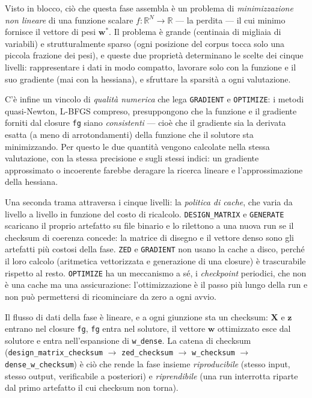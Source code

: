 Visto in blocco, ciò che questa fase assembla è un problema di
\emph{minimizzazione non lineare} di una funzione scalare
$f: \mathbb{R}^{N} \to \mathbb{R}$ — la perdita — il cui minimo fornisce il
vettore di pesi $\bm{w}^{*}$. Il problema è grande (centinaia di migliaia di
variabili) e strutturalmente sparso (ogni posizione del corpus tocca solo una
piccola frazione dei pesi), e queste due proprietà determinano le scelte dei
cinque livelli: rappresentare i dati in modo compatto, lavorare solo con la
funzione e il suo gradiente (mai con la hessiana), e sfruttare la sparsità a
ogni valutazione.

C'è infine un vincolo di \emph{qualità numerica} che lega
\texttt{GRADIENT} e \texttt{OPTIMIZE}: i metodi quasi-Newton, L-BFGS
compreso, presuppongono che la funzione e il gradiente forniti dal closure
\texttt{fg} siano \emph{consistenti} — cioè che il gradiente sia la
derivata esatta (a meno di arrotondamenti) della funzione che il solutore
sta minimizzando. Per questo le due quantità vengono calcolate nella stessa
valutazione, con la stessa precisione e sugli stessi indici: un gradiente
approssimato o incoerente farebbe deragare la ricerca lineare e
l'approssimazione della hessiana.

Una seconda trama attraversa i cinque livelli: la \emph{politica di cache},
che varia da livello a livello in funzione del costo di ricalcolo.
\texttt{DESIGN\_MATRIX} e \texttt{GENERATE} scaricano il proprio artefatto su
file binario e lo rilettono a una nuova run se il checksum di coerenza
concede: la matrice di disegno e il vettore denso sono gli artefatti più
costosi della fase. \texttt{ZED} e \texttt{GRADIENT} non usano la cache a
disco, perché il loro calcolo (aritmetica vettorizzata e generazione di una
closure) è trascurabile rispetto al resto. \texttt{OPTIMIZE} ha un
meccanismo a sé, i \emph{checkpoint} periodici, che non è una cache ma una
assicurazione: l'ottimizzazione è il passo più lungo della run e non può
permettersi di ricominciare da zero a ogni avvio.

Il flusso di dati della fase è lineare, e a ogni giunzione sta un checksum:
$\bm{X}$ e $\bm{z}$ entrano nel closure \texttt{fg}, \texttt{fg} entra nel
solutore, il vettore $\bm{w}$ ottimizzato esce dal solutore e entra
nell'espansione di \texttt{w\_dense}. La catena di checksum
(\texttt{design\_matrix\_checksum} $\to$ \texttt{zed\_checksum} $\to$
\texttt{w\_checksum} $\to$ \texttt{dense\_w\_checksum}) è ciò che rende la
fase insieme \emph{riproducibile} (stesso input, stesso output, verificabile
a posteriori) e \emph{riprendibile} (una run interrotta riparte dal primo
artefatto il cui checksum non torna).

